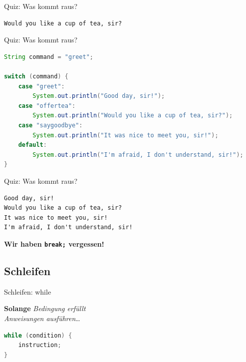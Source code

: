 \documentclass[18pt]{beamer}
\begin{document}
\begin{frame}[fragile]{Quiz: Was kommt raus?}
    \begin{block}{}
        \begin{lstlisting}
Would you like a cup of tea, sir?
        \end{lstlisting}
    \end{block}
\end{frame}
\begin{frame}[fragile]{Quiz: Was kommt raus?}
    \begin{exampleblock}{}
        \begin{lstlisting}[language=Java,basicstyle=\scriptsize]
String command = "greet";

switch (command) {
    case "greet":
        System.out.println("Good day, sir!");
    case "offertea":
        System.out.println("Would you like a cup of tea, sir?");
    case "saygoodbye":
        System.out.println("It was nice to meet you, sir!");
    default:
        System.out.println("I'm afraid, I don't understand, sir!");
}
        \end{lstlisting}
    \end{exampleblock}
\end{frame}

\begin{frame}[fragile]{Quiz: Was kommt raus?}
    \begin{block}{}
        \begin{lstlisting}
Good day, sir!
Would you like a cup of tea, sir?
It was nice to meet you, sir!
I'm afraid, I don't understand, sir!
        \end{lstlisting}
    \end{block}
    \vspace{.3in}
    \alert{\textbf{Wir haben \texttt{break;} vergessen!}}
\end{frame}

\subsection{Schleifen}

\begin{frame}[fragile]{Schleifen: while}
    \begin{block}{}
        \textbf{Solange} \textit{Bedingung erfüllt}\\
        \textit{Anweisungen ausführen}\dots
    \end{block}
    \pause

    \begin{block}{}
        \begin{lstlisting}[language=Java]
while (condition) {
    instruction;
}
        \end{lstlisting}
    \end{block}
\end{frame}
\end{document}
